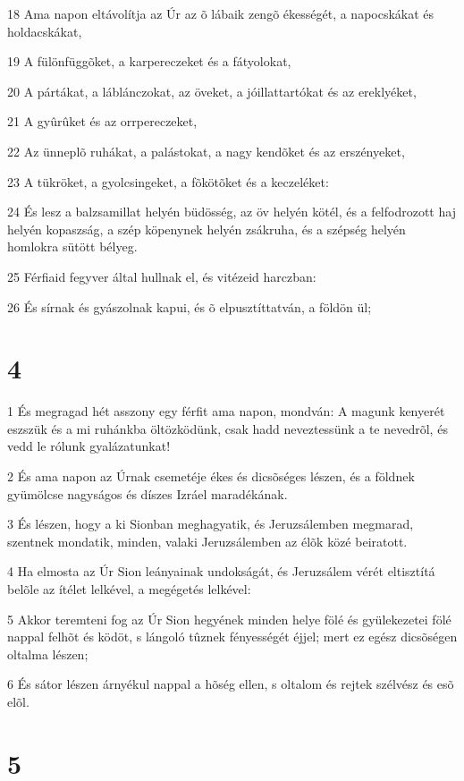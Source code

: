 \par 18 Ama napon eltávolítja az Úr az õ lábaik zengõ ékességét, a napocskákat és holdacskákat,
\par 19 A fülönfüggõket, a karpereczeket és a fátyolokat,
\par 20 A pártákat, a láblánczokat, az öveket, a jóillattartókat és az ereklyéket,
\par 21 A gyûrûket és az orrpereczeket,
\par 22 Az ünneplõ ruhákat, a palástokat, a nagy kendõket és az erszényeket,
\par 23 A tükröket, a gyolcsingeket, a fõkötõket és a keczeléket:
\par 24 És lesz a balzsamillat helyén büdösség, az öv helyén kötél, és a felfodrozott haj helyén kopaszság, a szép köpenynek helyén zsákruha, és a szépség helyén homlokra sütött bélyeg.
\par 25 Férfiaid fegyver által hullnak el, és vitézeid harczban:
\par 26 És sírnak és gyászolnak kapui, és õ elpusztíttatván, a földön ül;

\chapter{4}

\par 1 És megragad hét asszony egy férfit ama napon, mondván: A magunk kenyerét eszszük és a mi ruhánkba öltözködünk, csak hadd neveztessünk a te nevedrõl, és vedd le rólunk gyalázatunkat!
\par 2 És ama napon az Úrnak csemetéje ékes és dicsõséges lészen, és a földnek gyümölcse nagyságos és díszes  Izráel maradékának.
\par 3 És lészen, hogy a ki Sionban meghagyatik, és Jeruzsálemben megmarad, szentnek mondatik, minden, valaki Jeruzsálemben az élõk közé beiratott.
\par 4 Ha elmosta az Úr Sion leányainak undokságát, és Jeruzsálem vérét eltisztítá belõle az ítélet lelkével, a megégetés lelkével:
\par 5 Akkor teremteni fog az Úr Sion hegyének minden helye fölé és gyülekezetei fölé nappal felhõt és ködöt, s lángoló tûznek fényességét éjjel; mert ez egész dicsõségen oltalma lészen;
\par 6 És sátor lészen árnyékul nappal a hõség ellen, s oltalom és rejtek szélvész és esõ elõl.

\chapter{5}

